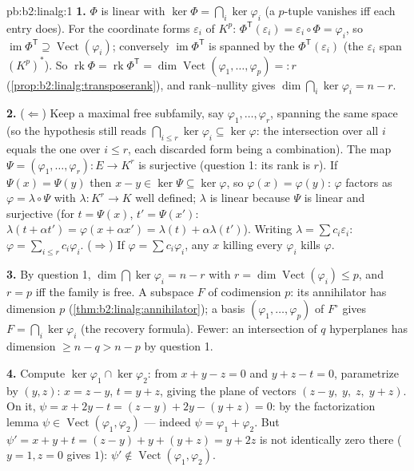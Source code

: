 \begin{solution}{pb:b2:linalg:1}
\textbf{1.} $\Phi$ is linear with $\ker\Phi = \bigcap_i
\ker\varphi_i$ (a $p$-tuple vanishes iff each entry does). For
the coordinate forms $\varepsilon_i$ of $K^p$: $\Phi^{\mathsf
T}(\varepsilon_i) = \varepsilon_i \circ \Phi = \varphi_i$, so
$\operatorname{im}\Phi^{\mathsf T} \supseteq
\operatorname{Vect}(\varphi_i)$; conversely
$\operatorname{im}\Phi^{\mathsf T}$ is spanned by the
$\Phi^{\mathsf T}(\varepsilon_i)$ (the $\varepsilon_i$ span
$(K^p)^*$). So $\operatorname{rk}\Phi = \operatorname{rk}
\Phi^{\mathsf T} = \dim\operatorname{Vect}(\varphi_1, \dots,
\varphi_p) =: r$ (\cref{prop:b2:linalg:transposerank}), and
rank--nullity gives $\dim\bigcap_i\ker\varphi_i = n - r$.

\textbf{2.} ($\Leftarrow$) Keep a maximal free subfamily, say
$\varphi_1, \dots, \varphi_r$, spanning the same space (so the
hypothesis still reads $\bigcap_{i \leq r}\ker\varphi_i \subseteq
\ker\varphi$: the intersection over all $i$ equals the one over
$i \leq r$, each discarded form being a combination). The map
$\Psi = (\varphi_1, \dots, \varphi_r) \colon E \to K^r$ is
surjective (question 1: its rank is $r$). If $\Psi(x) = \Psi(y)$
then $x - y \in \ker\Psi \subseteq \ker\varphi$, so $\varphi(x) =
\varphi(y)$: $\varphi$ factors as $\varphi = \lambda \circ \Psi$
with $\lambda \colon K^r \to K$ well defined; $\lambda$ is linear
because $\Psi$ is linear and surjective (for $t = \Psi(x)$, $t' =
\Psi(x')$: $\lambda(t + \alpha t') = \varphi(x + \alpha x') =
\lambda(t) + \alpha\lambda(t')$). Writing $\lambda = \sum c_i
\varepsilon_i$: $\varphi = \sum_{i \leq r} c_i\varphi_i$.
($\Rightarrow$) If $\varphi = \sum c_i \varphi_i$, any $x$
killing every $\varphi_i$ kills $\varphi$.

\textbf{3.} By question 1, $\dim\bigcap\ker\varphi_i = n - r$
with $r = \dim\operatorname{Vect}(\varphi_i) \leq p$, and $r = p$
iff the family is free. A subspace $F$ of codimension $p$: its
annihilator has dimension $p$
(\cref{thm:b2:linalg:annihilator}); a basis $(\varphi_1, \dots,
\varphi_p)$ of $F^\circ$ gives $F = \bigcap_i\ker\varphi_i$ (the
recovery formula). Fewer: an intersection of $q$ hyperplanes has
dimension $\geq n - q > n - p$ by question 1.

\textbf{4.} Compute $\ker\varphi_1 \cap \ker\varphi_2$: from $x
+ y - z = 0$ and $y + z - t = 0$, parametrize by $(y, z)$: $x = z
- y$, $t = y + z$, giving the plane of vectors $(z - y,\; y,\;
z,\; y + z)$. On it, $\psi = x + 2y - t = (z - y) + 2y - (y + z)
= 0$: by the factorization lemma $\psi \in
\operatorname{Vect}(\varphi_1, \varphi_2)$ --- indeed $\psi =
\varphi_1 + \varphi_2$. But $\psi' = x + y + t = (z - y) + y +
(y + z) = y + 2z$ is not identically zero there ($y = 1, z = 0$
gives $1$): $\psi' \notin \operatorname{Vect}(\varphi_1,
\varphi_2)$.


\end{solution}
